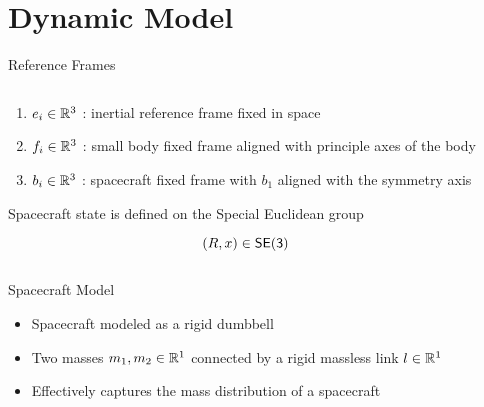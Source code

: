 
\section{Dynamic Model}

\begin{frame}{Reference Frames}

    \begin{columns}
        \begin{column}{0.5\textwidth}
            \begin{enumerate}
                \item \( e_i \in \mathbb{R}^3 \) : inertial reference frame fixed in space
                \item \( f_i \in \mathbb{R}^3 \) : small body fixed frame aligned with principle axes of the body
                \item \( b_i \in \mathbb{R}^3 \) : spacecraft fixed frame with \( b_1 \) aligned with the symmetry axis
            \end{enumerate}
            
            \begin{block}{}
                Spacecraft state is defined on the Special Euclidean group

                \[ \left( R, x \right) \in \mathsf{SE(3)} \]
            \end{block}
        \end{column}
        \begin{column}{0.5\textwidth}
            \begin{scaletikzpicturetowidth}{2\columnwidth}
                \resizebox{\columnwidth}{!}{%
                
            }
            \end{scaletikzpicturetowidth}
        \end{column}
    \end{columns}
\end{frame}

\begin{frame}{Spacecraft Model}
    \begin{itemize}
        \item Spacecraft modeled as a rigid dumbbell
        \item Two masses \( m_1, m_2 \in \mathbb{R}^1 \) connected by a rigid massless link \( l \in \mathbb{R}^1\)
        \item Effectively captures the mass distribution of a spacecraft
    \end{itemize}

    \resizebox{\textwidth}{!}{%
        
    }
\end{frame}

